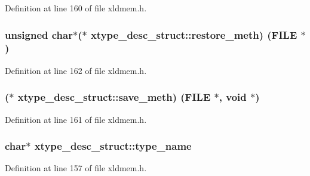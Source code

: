 Definition at line 160 of file xldmem.\+h.

\subsubsection[{\texorpdfstring{restore\+\_\+meth}{restore_meth}}]{\setlength{\rightskip}{0pt plus 5cm}unsigned char$\ast$($\ast$ xtype\+\_\+desc\+\_\+struct\+::restore\+\_\+meth) (F\+I\+LE $\ast$)}\hypertarget{structxtype__desc__struct_a3282dd0e4b267fb5338d7c6084667e2b}{}\label{structxtype__desc__struct_a3282dd0e4b267fb5338d7c6084667e2b}


Definition at line 162 of file xldmem.\+h.

\subsubsection[{\texorpdfstring{save\+\_\+meth}{save_meth}}]{($\ast$ xtype\+\_\+desc\+\_\+struct\+::save\+\_\+meth) (F\+I\+LE $\ast$, {\bf void} $\ast$)}\hypertarget{structxtype__desc__struct_a151b060e4c324981ff30fb9738fb5559}{}\label{structxtype__desc__struct_a151b060e4c324981ff30fb9738fb5559}


Definition at line 161 of file xldmem.\+h.

\subsubsection[{\texorpdfstring{type\+\_\+name}{type_name}}]{\setlength{\rightskip}{0pt plus 5cm}char$\ast$ xtype\+\_\+desc\+\_\+struct\+::type\+\_\+name}\hypertarget{structxtype__desc__struct_a4d8c07f36fad3beddede142aa20d7051}{}\label{structxtype__desc__struct_a4d8c07f36fad3beddede142aa20d7051}


Definition at line 157 of file xldmem.\+h.

